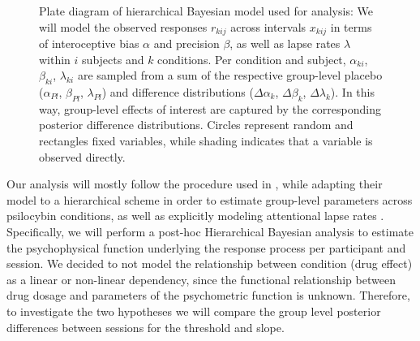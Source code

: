 \documentclass{article}
\begin{document}
\begin{figure}
    \caption{Plate diagram of hierarchical Bayesian model used for analysis: We will model the observed responses $r_{kij}$ across intervals $x_{kij}$ in terms of interoceptive bias $\alpha$ and precision $\beta$, as well as lapse rates $\lambda$ within $i$ subjects and $k$ conditions.
    Per condition and subject, $\alpha_{ki}$, $\beta_{ki}$, $\lambda_{ki}$ are sampled from a sum of the respective group-level placebo ($\alpha_{Pl}$, $\beta_{Pl}$, $\lambda_{Pl}$) and difference distributions ($\Delta\alpha_{k}$, $\Delta\beta_{k}$, $\Delta\lambda_{k}$). In this way, group-level effects of interest are captured by the corresponding posterior difference distributions. Circles represent random and rectangles fixed variables, while shading indicates that a variable is observed directly.}
    \label{fig:plateForPowerAnalysis}
\end{figure}

Our analysis will mostly follow the procedure used in \textcite{legrand2022heart}, while adapting their model to a hierarchical scheme in order to estimate group-level parameters across psilocybin conditions, as well as explicitly modeling attentional lapse rates \parencite{wichmann2001psychometricLapse}.
Specifically, we will perform a post-hoc Hierarchical Bayesian analysis to estimate the psychophysical function underlying the response process per participant and session. 
We decided to not model the relationship between condition (drug effect) as a linear or non-linear dependency, since the functional relationship between drug dosage and parameters of the psychometric function is unknown. 
Therefore, to investigate the two hypotheses we will compare the group level posterior differences between sessions for the threshold and slope.
\end{document}
